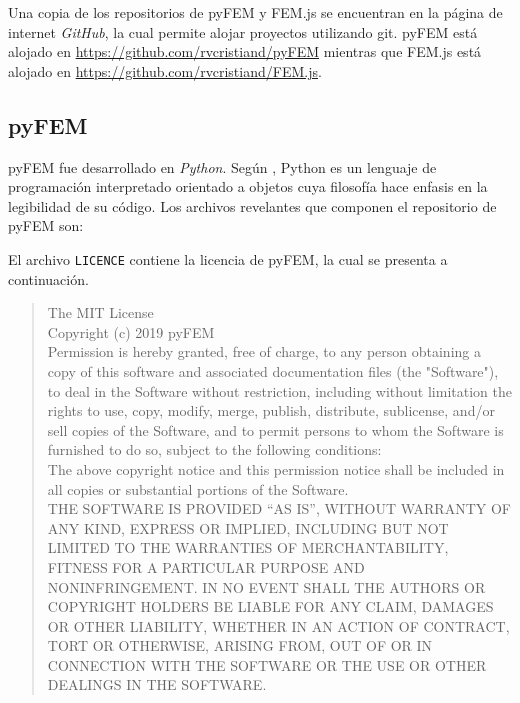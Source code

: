 Una copia de los repositorios de pyFEM y FEM.js se encuentran en la página de internet \emph{GitHub}, la cual permite alojar proyectos utilizando git. pyFEM está alojado en \url{https://github.com/rvcristiand/pyFEM} mientras que FEM.js está alojado en \url{https://github.com/rvcristiand/FEM.js}.\\

\subsection{pyFEM}

pyFEM fue desarrollado en \emph{Python}. Según \cite{lutz2013python}, Python es un lenguaje de programación interpretado orientado a objetos cuya filosofía hace enfasis en la legibilidad de su código. Los archivos revelantes que componen el repositorio de pyFEM son:
\pagebreak


\bigskip
El archivo \verb|LICENCE| contiene la licencia de pyFEM, la cual se presenta a continuación.

\begin{quotation}
  The MIT License\\

  Copyright (c) 2019 pyFEM\\

  Permission is hereby granted, free of charge, to any person obtaining a copy of this software and associated documentation files (the "Software"), to deal in the Software without restriction, including without limitation the rights to use, copy, modify, merge, publish, distribute, sublicense, and/or sell copies of the Software, and to permit persons to whom the Software is furnished to do so, subject to the following conditions:\\
  
  The above copyright notice and this permission notice shall be included in all copies or substantial portions of the Software.\\

  THE SOFTWARE IS PROVIDED ``AS IS'', WITHOUT WARRANTY OF ANY KIND, EXPRESS OR IMPLIED, INCLUDING BUT NOT LIMITED TO THE WARRANTIES OF MERCHANTABILITY, FITNESS FOR A PARTICULAR PURPOSE AND NONINFRINGEMENT. IN NO EVENT SHALL THE AUTHORS OR COPYRIGHT HOLDERS BE LIABLE FOR ANY CLAIM, DAMAGES OR OTHER LIABILITY, WHETHER IN AN ACTION OF CONTRACT, TORT OR OTHERWISE, ARISING FROM, OUT OF OR IN CONNECTION WITH THE SOFTWARE OR THE USE OR OTHER DEALINGS IN THE SOFTWARE.
\end{quotation}


